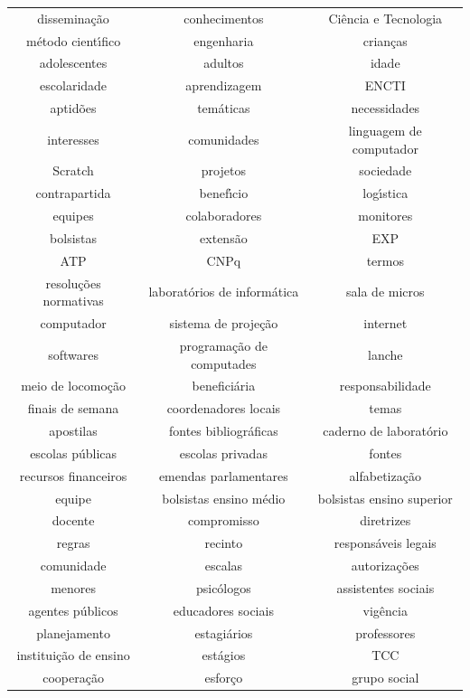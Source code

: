 \documentclass[
12pt,		%
openright,	%
twoside,  %
a4paper,			%
chapter=TITLE,		%
english,			%
french,				%
spanish,			%
brazil				%
]{USPSC-classe/USPSC_RedarTex}
\begin{document}
\begin{table}[htb]
\begin{tabular}{|c|c|c|}
dissemina\c{c}\~ao  &  conhecimentos  &  Ci\^encia e Tecnologia \\
m\'etodo cient\'{\i}fico  &  engenharia  &  crian\c{c}as \\
adolescentes  &  adultos  &  idade \\
escolaridade  &  aprendizagem  &  ENCTI \\
aptid\~oes  &  tem\'aticas  &  necessidades \\
interesses  &  comunidades  &  linguagem de computador \\
Scratch  &  projetos  &  sociedade \\
contrapartida  &  benef\'{\i}cio  &  log\'{\i}stica \\
equipes  &  colaboradores  &  monitores \\
bolsistas  &  extens\~ao  &  EXP \\
ATP  &  CNPq  &  termos \\
resolu\c{c}\~oes normativas  &  laborat\'orios de inform\'atica  &  sala de micros  \\
computador  &  sistema de proje\c{c}\~ao  &  internet \\
softwares  &  programa\c{c}\~ao de computades  &  lanche \\
meio de locomo\c{c}\~ao  &  benefici\'aria  &  responsabilidade \\
finais de semana  &  coordenadores locais  &  temas \\
apostilas  &  fontes bibliogr\'aficas  &  caderno de laborat\'orio \\
escolas p\'ublicas  &  escolas privadas  &  fontes \\
recursos financeiros  &  emendas parlamentares  &  alfabetiza\c{c}\~ao \\
equipe  &  bolsistas ensino m\'edio  &  bolsistas ensino superior \\
docente  &  compromisso  &  diretrizes \\
regras  &  recinto  &  respons\'aveis legais \\
comunidade  &  escalas  &  autoriza\c{c}\~oes \\
menores  &  psic\'ologos  &  assistentes sociais \\
agentes p\'ublicos  &  educadores sociais  &  vig\^encia \\
planejamento  &  estagi\'arios  &  professores \\
institui\c{c}\~ao de ensino  &  est\'agios  &  TCC \\
coopera\c{c}\~ao  &  esfor\c{c}o  &  grupo social \\

\end{tabular}
\end{table}
\end{document}
